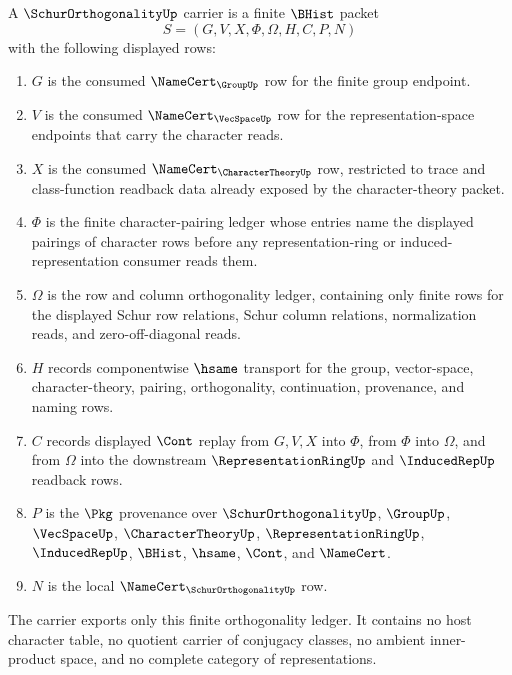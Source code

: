 \begin{definition}
\label{def:schur-orthogonality-carrier}
A $\SchurOrthogonalityUp$ carrier is a finite $\BHist$ packet
$$
S=(G,V,X,\Phi,\Omega,H,C,P,N)
$$
with the following displayed rows:
\begin{enumerate}
\item $G$ is the consumed $\NameCert_{\GroupUp}$ row for the finite group endpoint.
\item $V$ is the consumed $\NameCert_{\VecSpaceUp}$ row for the representation-space endpoints that carry the character reads.
\item $X$ is the consumed $\NameCert_{\CharacterTheoryUp}$ row, restricted to trace and class-function readback data already exposed by the character-theory packet.
\item $\Phi$ is the finite character-pairing ledger whose entries name the displayed pairings of character rows before any representation-ring or induced-representation consumer reads them.
\item $\Omega$ is the row and column orthogonality ledger, containing only finite rows for the displayed Schur row relations, Schur column relations, normalization reads, and zero-off-diagonal reads.
\item $H$ records componentwise $\hsame$ transport for the group, vector-space, character-theory, pairing, orthogonality, continuation, provenance, and naming rows.
\item $C$ records displayed $\Cont$ replay from $G,V,X$ into $\Phi$, from $\Phi$ into $\Omega$, and from $\Omega$ into the downstream $\RepresentationRingUp$ and $\InducedRepUp$ readback rows.
\item $P$ is the $\Pkg$ provenance over $\SchurOrthogonalityUp$, $\GroupUp$, $\VecSpaceUp$, $\CharacterTheoryUp$, $\RepresentationRingUp$, $\InducedRepUp$, $\BHist$, $\hsame$, $\Cont$, and $\NameCert$.
\item $N$ is the local $\NameCert_{\SchurOrthogonalityUp}$ row.
\end{enumerate}
The carrier exports only this finite orthogonality ledger. It contains no host character table, no quotient carrier of conjugacy classes, no ambient inner-product space, and no complete category of representations.
\end{definition}

